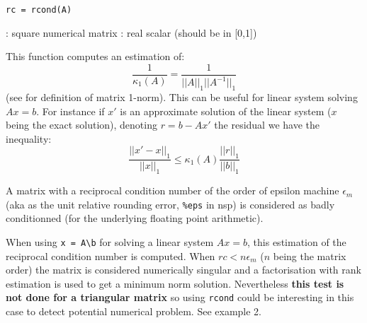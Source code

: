 
\begin{mandesc}
\end{mandesc}

\begin{calling_sequence}
\begin{verbatim}
rc = rcond(A)
\end{verbatim}
\end{calling_sequence}
\begin{parameters}
  \begin{varlist}
    :  square numerical matrix
    : real scalar (should be in [0,1])
  \end{varlist}
\end{parameters}

\begin{mandescription}
This function computes an estimation of:
$$
     \frac{1}{\kappa_1(A)} =  \frac{1}{||A||_1 ||A^{-1}||_1}
$$
(see  for definition of matrix 1-norm).
This can be useful for linear system solving $A x = b$. For instance
if $x'$ is an approximate solution of the linear system ($x$ being 
the exact solution), denoting $r = b - Ax'$ the residual we have 
the inequality:
$$
\frac{||x' - x||_1}{||x||_1} \le \kappa_1(A) \frac{||r||_1}{||b||_1}
$$

A matrix with a reciprocal condition number of the order of
epsilon machine $\epsilon_m$ (aka as the unit relative rounding 
error, \verb+%eps+ in nsp) is considered as badly conditionned 
(for the underlying floating point arithmetic). 

When using \verb+x = A\b+ for solving a linear system $Ax=b$, this
estimation of the reciprocal condition number is computed. When
$rc < n \epsilon_m$ ($n$ being the matrix order) the matrix is
considered numerically singular and a 
factorisation with rank estimation is used to get a minimum norm
solution. Nevertheless {\bf this test is not done for a triangular 
matrix} so using \verb+rcond+ could be interesting in this case
to detect potential numerical problem. See example 2.
\end{mandescription}

